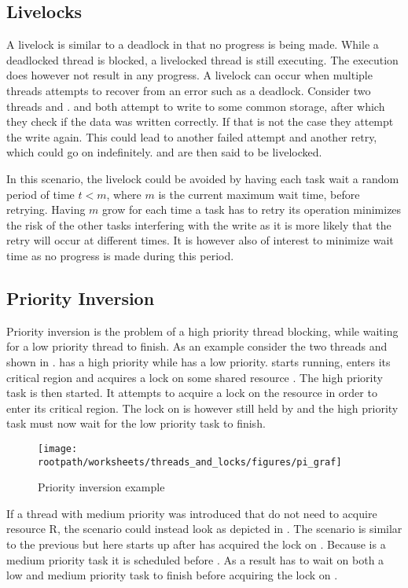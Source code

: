 \subsection{Livelocks} A livelock is similar to a deadlock in that no progress is being made. While a deadlocked thread is blocked, a livelocked thread is still executing. The execution does however not result in any progress. A livelock can occur when multiple threads attempts to recover from an error such as a deadlock\cite[p. 457]{tanenbaum2008modern}. Consider two threads  and .  and  both attempt to write to some common storage, after which they check if the data was written correctly. If that is not the case they attempt the write again. This could lead to another failed attempt and another retry, which could go on indefinitely.  and  are then said to be livelocked.

In this scenario, the livelock could be avoided by having each task wait a random period of time $t < m$, where $m$ is the current maximum wait time, before retrying. Having $m$ grow for each time a task has to retry its operation minimizes the risk of the other tasks interfering with the write as it is more likely that the retry will occur at different times. It is however also of interest to minimize wait time as no progress is made during this period.

\subsection{Priority Inversion}
Priority inversion is the problem of a high priority thread blocking, while waiting for a low priority thread to finish\cite[p. 456]{tanenbaum2008modern}. As an example consider the two threads  and  shown in .  has a high priority while  has a low priority.  starts running, enters its critical region and acquires a lock on some shared resource . The high priority task  is then started. It attempts to acquire a lock on the resource  in order to enter its critical region. The lock on  is however still held by  and the high priority task  must now wait for the low priority task  to finish.

\begin{figure}[htbp]
\centering
 \texttt{[image: \\rootpath/worksheets/threads\_and\_locks/figures/pi\_graf]} 
 \caption{Priority inversion example}
\label{fig:priority_inversion}
\end{figure}
If a thread  with medium priority was introduced that do not need to acquire resource R, the scenario could instead look as depicted in . The scenario is similar to the previous but here  starts up after  has acquired the lock on . Because  is a medium priority task it is scheduled before . As a result  has to wait on both a low and medium priority task to finish before acquiring the lock on .

